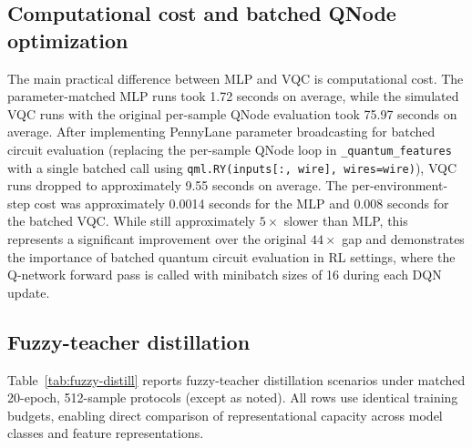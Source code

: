 \subsection*{Computational cost and batched QNode optimization}

The main practical difference between MLP and VQC is computational cost. The
parameter-matched MLP runs took 1.72 seconds on average, while the simulated
VQC runs with the original per-sample QNode evaluation took 75.97 seconds on
average. After implementing PennyLane parameter broadcasting for batched
circuit evaluation (replacing the per-sample QNode loop in
\texttt{\_quantum\_features} with a single batched call using
\texttt{qml.RY(inputs[:, wire], wires=wire)}), VQC runs dropped to approximately
9.55 seconds on average. The per-environment-step cost was approximately 0.0014
seconds for the MLP and 0.008 seconds for the batched VQC. While still
approximately $5\times$ slower than MLP, this represents a significant
improvement over the original $44\times$ gap and demonstrates the importance of
batched quantum circuit evaluation in RL settings, where the Q-network forward
pass is called with minibatch sizes of 16 during each DQN update.

\subsection*{Fuzzy-teacher distillation}

Table~\ref{tab:fuzzy-distill} reports fuzzy-teacher distillation scenarios
under matched 20-epoch, 512-sample protocols (except as noted). All rows use
identical training budgets, enabling direct comparison of representational
capacity across model classes and feature representations.

